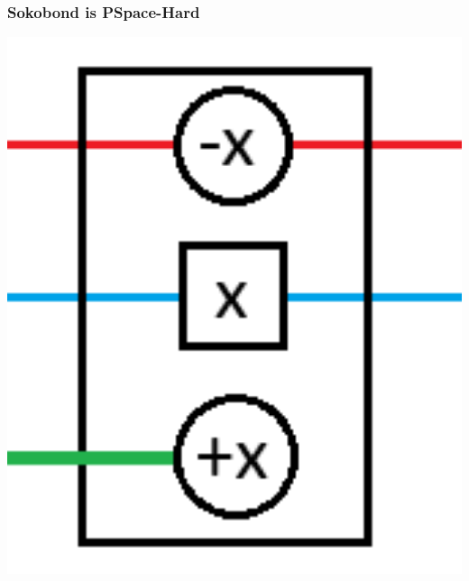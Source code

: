 \documentclass{beamer}
\begin{document}
\begin{frame}
  \frametitle{Sokobond is PSpace-Hard}
  \begin{minipage}[t]{0.49\textwidth}
    \includegraphics[width=1\textwidth]{res/DoorOpenOptional.png}
  \end{minipage}
  \begin{minipage}[t]{0.49\textwidth}

\end{minipage}
\end{frame}
\end{document}
